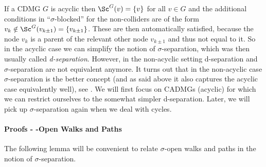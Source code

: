 \begin{Rem}
    If a CDMG $G$ is acyclic then $\Sc^G(v)=\{v\}$ for all $v \in G$ and the additional conditions in ``$\sigma$-blocked'' 
    for the non-colliders are of the form $v_k \notin \Sc^G(v_{k\pm 1})=\{v_{k\pm1}\}$.
    These are then automatically satisfied, because the node $v_k$ is a parent of 
    the relevant other node $v_{k \pm1}$ and thus not equal to it. 
    So in the acyclic case we can simplify the notion of $\sigma$-separation, which was then usually called \emph{d-separation}.
    However, in the non-acyclic setting d-separation and $\sigma$-separation are not equivalent anymore.
    It turns out that in the non-acyclic case $\sigma$-separation is the better concept (and as said above it also captures the acyclic case equivalently well), see \cite{FM17,FM18,FM20,BFPM21}.
    We will first focus on CADMGs (acyclic) for which we can restrict ourselves to the somewhat simpler d-separation.
    Later, we will pick up $\sigma$-separation again when we deal with cycles.
\end{Rem}

\paragraph{Proofs - \textsigma-Open Walks and Paths}\hfill%

The following lemma will be convenient to relate $\sigma$-open walks and paths in the notion of $\sigma$-separation.


